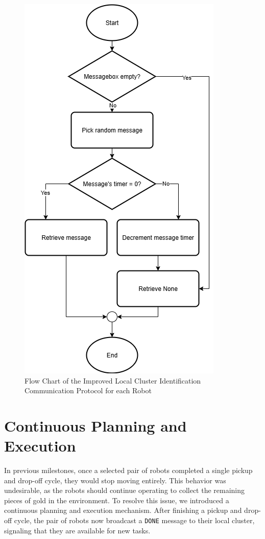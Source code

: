 \documentclass[12pt,a4paper]{article}
\begin{document}
\begin{figure}
    \centering
    \includegraphics[width=0.6\linewidth]{images/message_flow.png}
    \caption{Flow Chart of the Improved Local Cluster Identification Communication Protocol for each Robot}   
    \label{fig:msg-flowchart}
\end{figure}

\section{Continuous Planning and Execution}
In previous milestones, once a selected pair of robots completed a single pickup and drop-off cycle, they would stop moving entirely. This behavior was undesirable, as the robots should continue operating to collect the remaining pieces of gold in the environment. To resolve this issue, we introduced a continuous planning and execution mechanism. After finishing a pickup and drop-off cycle, the pair of robots now broadcast a \texttt{DONE} message to their local cluster, signaling that they are available for new tasks.
\end{document}
